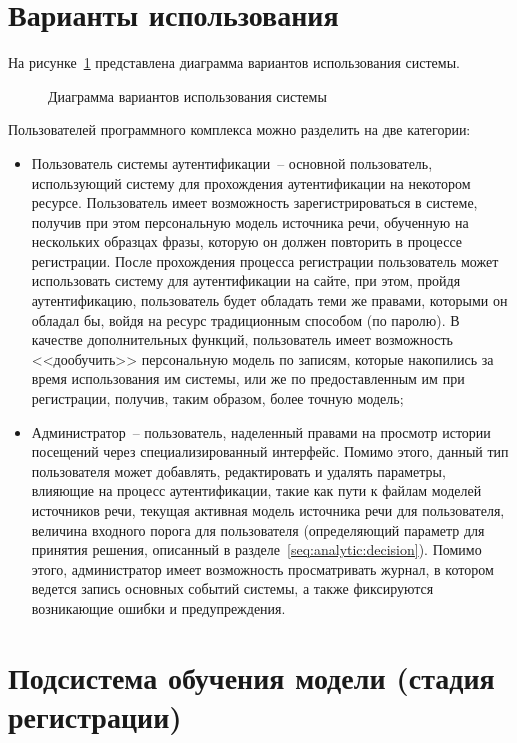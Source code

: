 \section{Варианты использования}

На рисунке~\ref{fig:use_cases} представлена диаграмма вариантов использования системы.

\begin{figure}[htp!]
    \caption{Диаграмма вариантов использования системы}
    \label{fig:use_cases}
\end{figure}

Пользователей программного комплекса можно разделить на две категории:
\begin{itemize}
\item Пользователь системы аутентификации~-- основной пользователь, использующий
систему для прохождения аутентификации на некотором ресурсе. Пользователь имеет
возможность зарегистрироваться в системе, получив при этом персональную модель
источника речи, обученную на нескольких образцах фразы, которую он должен
повторить в процессе регистрации. После прохождения процесса регистрации
пользователь может использовать систему для аутентификации на сайте, при этом,
пройдя аутентификацию, пользователь будет обладать теми же правами, которыми он
обладал бы, войдя на ресурс традиционным способом (по паролю). В качестве
дополнительных функций, пользователь имеет возможность <<дообучить>>
персональную модель по записям, которые накопились за время использования им
системы, или же по предоставленным им при регистрации, получив, таким образом, более точную модель;
\item Администратор~-- пользователь, наделенный правами на просмотр истории посещений через специализированный интерфейс. Помимо этого, данный тип пользователя может добавлять, редактировать и удалять параметры, влияющие на процесс аутентификации, такие как пути к файлам моделей источников речи, текущая активная модель источника речи для пользователя, величина входного порога для пользователя (определяющий параметр для принятия решения, описанный в разделе~\ref{seq:analytic:decision}). Помимо этого, администратор имеет возможность просматривать журнал, в котором ведется запись основных событий системы, а также фиксируются возникающие ошибки и предупреждения.
\end{itemize}

\section{Подсистема обучения модели (стадия регистрации)}

